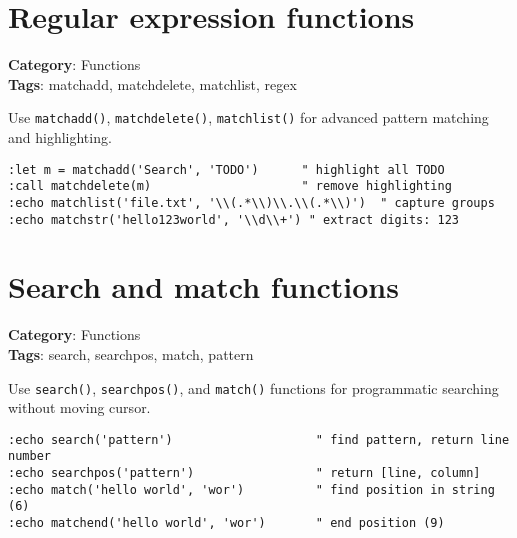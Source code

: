\section{Regular expression functions}

\textbf{Category}: Functions\\ \textbf{Tags}: matchadd, matchdelete, matchlist, regex
\vspace{0.5cm}

Use {\footnotesize \Verb§matchadd()§}, {\footnotesize \Verb§matchdelete()§}, {\footnotesize \Verb§matchlist()§} for advanced pattern matching and highlighting.

\begin{Exa*}{}
\begin{Verbatim}[fontsize=\footnotesize, breaklines, breakanywhere]
:let m = matchadd('Search', 'TODO')      " highlight all TODO
:call matchdelete(m)                     " remove highlighting
:echo matchlist('file.txt', '\\(.*\\)\\.\\(.*\\)')  " capture groups
:echo matchstr('hello123world', '\\d\\+') " extract digits: 123
\end{Verbatim}
\end{Exa*}

\section{Search and match functions}

\textbf{Category}: Functions\\ \textbf{Tags}: search, searchpos, match, pattern
\vspace{0.5cm}

Use {\footnotesize \Verb§search()§}, {\footnotesize \Verb§searchpos()§}, and {\footnotesize \Verb§match()§} functions for programmatic searching without moving cursor.

\begin{Exa*}{}
\begin{Verbatim}[fontsize=\footnotesize, breaklines, breakanywhere]
:echo search('pattern')                    " find pattern, return line number
:echo searchpos('pattern')                 " return [line, column]
:echo match('hello world', 'wor')          " find position in string (6)
:echo matchend('hello world', 'wor')       " end position (9)
\end{Verbatim}
\end{Exa*}

